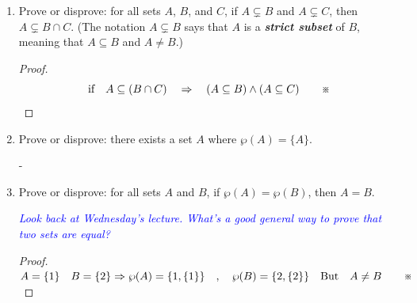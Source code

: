 \documentclass{article}
\renewcommand{\(}{\left(}
\renewcommand{\)}{\right)}
\theoremstyle{plain}
\theoremstyle{plain}
\theoremstyle{definition}
\begin{document}
\begin{enumerate}[label*=\roman*.,ref=\roman*]
\begin{shaded}
\begin{proof}
\end{proof}
\end{shaded}

\item Prove or disprove: for all sets $A$, $B$, and $C$, if $A \subsetneq B$ and $A \subsetneq C$, then $A \subsetneq B \cap C$. (The notation $A \subsetneq B$ says that $A$ is a \textit{\textbf{strict subset}} of $B$, meaning that $A \subseteq B$ and $A \neq B$.)

\begin{shaded}
\begin{proof}
  $$ \text{if} \quad A \subseteq (B \cap C) \quad \Rightarrow \quad (A \subseteq B) \wedge (A \subseteq C) \qquad \text{\textreferencemark} $$
\end{proof}
\end{shaded}

\item Prove or disprove: there exists a set $A$ where $\wp(A) = \{A\}$.

\begin{shaded}
-
\end{shaded}

\item Prove or disprove: for all sets $A$ and $B$,
if $\wp(A) = \wp(B)$, then $A = B$.

\textit{\textcolor{blue}{ Look back at Wednesday's lecture. What's a good general way to prove that two sets are equal? }}

\begin{shaded}
\begin{proof}
 $ A = \{1\} \quad B = \{2\} \\
  \Rightarrow \wp(A) = \{ 1, \{1\}\} \quad , \quad \wp(B) = \{ 2, \{2\}\} \quad \text{But} \quad A \neq B \qquad \text{\textreferencemark}$
\end{proof}
\end{shaded}

\end{enumerate}
\end{document}
